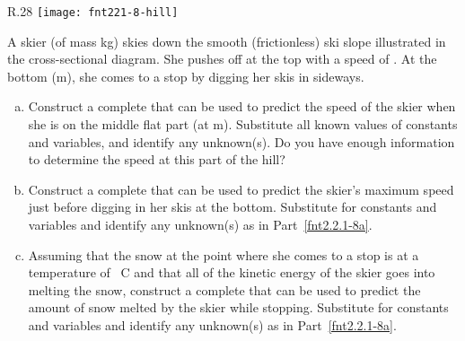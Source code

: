\label{fnt2.2.1-8}

\begin{wrapfigure}{R}{.28\textwidth}
	\vspace{-15pt}
  	\centering
	\texttt{[image: fnt221-8-hill]}
	\vspace{-10pt}
\end{wrapfigure}

A skier (of mass \unit[55]{kg}) skies down the smooth (frictionless) ski slope illustrated in the cross-sectional diagram. She pushes off at the top with a speed of . At the bottom (\unit[0]{m}), she comes to a stop by digging her skis in sideways.

\begin{enumerate}[(a)]
	\item\label{fnt2.2.1-8a} Construct a complete \EnergyDiagram{} that can be used to predict the speed of the skier when she is on the middle flat part (at \unit[10]{m}). Substitute all known values of constants and variables, and identify any unknown(s). Do you have enough information to determine the speed at this part of the hill?

	
	\item\label{fnt2.2.1-8b} Construct a complete \EnergyDiagram{} that can be used to predict the skier's maximum speed just before digging in her skis at the bottom. Substitute for constants and variables and identify any unknown(s) as in Part~\eqref{fnt2.2.1-8a}.

	
	\item\label{fnt2.2.1-8c} Assuming that the snow at the point where she comes to a stop is at a temperature of \unit[0]{\textdegree{}C} and that all of the kinetic energy of the skier goes into melting the snow, construct a complete \EnergyDiagram{} that can be used to predict the amount of snow melted by the skier while stopping. Substitute for constants and variables and identify any unknown(s) as in Part~\eqref{fnt2.2.1-8a}.
\end{enumerate}
